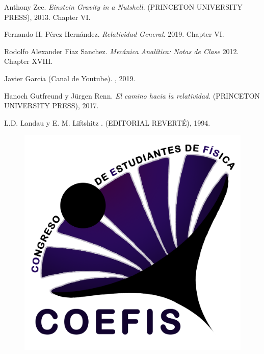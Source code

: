 \documentclass[a0,portrait]{a0poster} %
\begin{document}
\begin{multicols}{2}
\vspace{20pt}\textbf{}
\small{
\begin{thebibliography}{6}
Anthony Zee.
\textit{Einstein Gravity in a Nutshell}.
(PRINCETON UNIVERSITY PRESS), 2013. Chapter VI.

Fernando H. Pérez Hernández.
\textit{Relatividad General}.
2019. Chapter VI.

Rodolfo Alexander Fiaz Sanchez.
\textit{Mecánica Analítica: Notas de Clase}
2012. Chapter XVIII.

Javier Garcia (Canal de Youtube).
, 2019.

Hanoch Gutfreund y Jürgen Renn.
\textit{El camino hacia la relatividad}.
(PRINCETON UNIVERSITY PRESS), 2017.

L.D. Landau y E. M. Liftshitz
.
(EDITORIAL REVERTÉ), 1994.
\end{thebibliography}}

\begin{figure}[H]
    \centering
    \includegraphics[scale = 0.8]{media/logo_coefis.png}
\end{figure}

\end{multicols}
\end{document}

